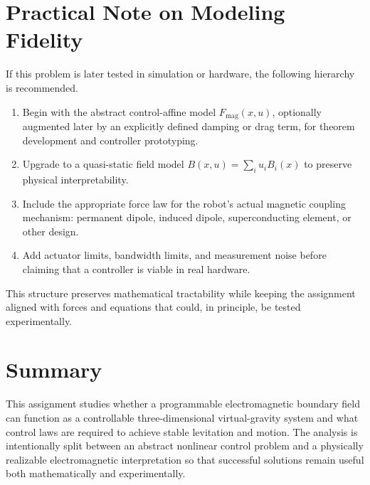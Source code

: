 \documentclass[11pt]{article}
\begin{document}
\section{Practical Note on Modeling Fidelity}
If this problem is later tested in simulation or hardware, the following hierarchy is recommended.
\begin{enumerate}[label=\arabic*.]
    \item Begin with the abstract control-affine model $F_{\mathrm{mag}}(x,u)$, optionally augmented later by an explicitly defined damping or drag term, for theorem development and controller prototyping.
    \item Upgrade to a quasi-static field model $B(x,u)=\sum_i u_i B_i(x)$ to preserve physical interpretability.
    \item Include the appropriate force law for the robot's actual magnetic coupling mechanism: permanent dipole, induced dipole, superconducting element, or other design.
    \item Add actuator limits, bandwidth limits, and measurement noise before claiming that a controller is viable in real hardware.
\end{enumerate}
This structure preserves mathematical tractability while keeping the assignment aligned with forces and equations that could, in principle, be tested experimentally.

\section{Summary}
This assignment studies whether a programmable electromagnetic boundary field can function as a controllable three-dimensional virtual-gravity system and what control laws are required to achieve stable levitation and motion. The analysis is intentionally split between an abstract nonlinear control problem and a physically realizable electromagnetic interpretation so that successful solutions remain useful both mathematically and experimentally.
\end{document}
